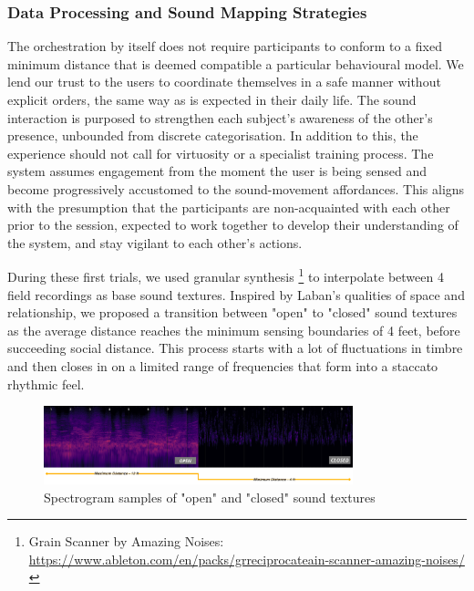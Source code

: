 \subsubsection{Data Processing and Sound Mapping Strategies}
\label{sec:mapping}

The orchestration by itself does not require participants to conform to a fixed minimum distance that is deemed compatible a particular behavioural model. We lend our trust to the users to coordinate themselves in a safe manner without explicit orders, the same way as is expected in their daily life. The sound interaction is purposed to strengthen each subject's awareness of the other's presence, unbounded from discrete categorisation. In addition to this, the experience should not call for virtuosity or a specialist training process. The system assumes engagement from the moment the user is being sensed and become progressively accustomed to the sound-movement affordances. This aligns with the presumption that the participants are non-acquainted with each other prior to the session, expected to work together to develop their understanding of the system, and stay vigilant to each other's actions.

During these first trials, we used granular synthesis \footnote{{Grain Scanner
by Amazing Noises: \url{https://www.ableton.com/en/packs/grreciprocateain-scanner-amazing-noises/}}} to interpolate between 4 field recordings as base sound textures. Inspired by Laban's qualities of space and relationship, we proposed a transition between "open" to "closed" sound textures as the average distance reaches the minimum sensing boundaries of 4 feet, before succeeding social distance. This process starts with a lot of fluctuations in timbre and then closes in on a limited range of frequencies that form into a staccato rhythmic feel. 

\begin{figure}[!h]
\captionsetup{width=1.0\textwidth}
\centering
\includegraphics[width=0.8\textwidth,keepaspectratio]{Chapters/Figures/adse_ess/open_closed_examples_annotated_landscape_line.png}
{\caption{Spectrogram samples of "open" and "closed" sound textures}\label{fig:sound_examples}}
\end{figure}

